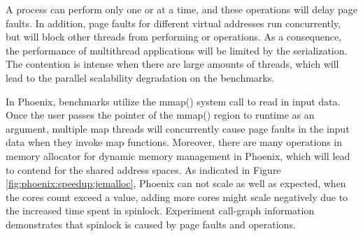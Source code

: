 A process can perform only one  or  at a time, and these operations will delay page faults. 
In addition, page faults for different virtual addresses run concurrently, but will block other threads from performing  or  operations.
As a consequence, the performance of multithread applications will be limited by the serialization. 
The contention is intense when there are large amounts of threads, which will lead to the parallel scalability degradation on the benchmarks.


In Phoenix, benchmarks utilize the mmap() system call to read in input data. 
Once the user passes the pointer of the mmap() region to runtime as an argument, multiple map threads will concurrently cause page faults in the input data when they invoke map functions.
Moreover, there are many  operations in memory allocator for dynamic memory management in Phoenix, which will lead to contend for the shared address spaces.
As indicated in Figure \ref{fig:phoenix:speedup:jemalloc}, Phoenix can not scale as well as expected, when the cores count exceed a value, adding more cores might scale negatively due to the increased time spent in spinlock.
Experiment call-graph information demonstrates that spinlock is caused by page faults and  operations.




%

